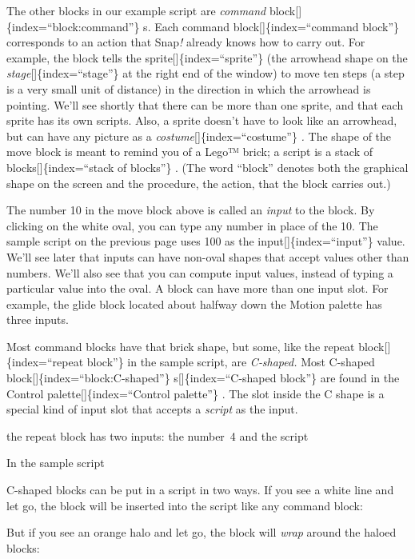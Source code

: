 \documentclass[
  letterpaper,
]{book}
\begin{document}
The other blocks in our example script are \emph{command}
block{[}{]}\{index=``block:command''\} s. Each command
block{[}{]}\{index=``command block''\} corresponds to an action that
Snap\emph{!} already knows how to carry out. For example, the block
tells the sprite{[}{]}\{index=``sprite''\} (the arrowhead shape on the
\emph{stage}{[}{]}\{index=``stage''\} at the right end of the window) to
move ten steps (a step is a very small unit of distance) in the
direction in which the arrowhead is pointing. We'll see shortly that
there can be more than one sprite, and that each sprite has its own
scripts. Also, a sprite doesn't have to look like an arrowhead, but can
have any picture as a \emph{costume}{[}{]}\{index=``costume''\} \emph{.}
The shape of the move block is meant to remind you of a Lego™ brick; a
script is a stack of blocks{[}{]}\{index=``stack of blocks''\} . (The
word ``block'' denotes both the graphical shape on the screen and the
procedure, the action, that the block carries out.)

The number 10 in the move block above is called an \emph{input} to the
block. By clicking on the white oval, you can type any number in place
of the 10. The sample script on the previous page uses 100 as the
input{[}{]}\{index=``input''\} value. We'll see later that inputs can
have non-oval shapes that accept values other than numbers. We'll also
see that you can compute input values, instead of typing a particular
value into the oval. A block can have more than one input slot. For
example, the glide block located about halfway down the Motion palette
has three inputs.

Most command blocks have that brick shape, but some, like the repeat
block{[}{]}\{index=``repeat block''\} in the sample script, are
\emph{C‑shaped.} Most C-shaped block{[}{]}\{index=``block:C-shaped''\}
s{[}{]}\{index=``C-shaped block''\} are found in the Control
palette{[}{]}\{index=``Control palette''\} . The slot inside the C shape
is a special kind of input slot that accepts a \emph{script} as the
input.

the repeat block has two inputs: the number~4 and the script

In the sample script

C-shaped blocks can be put in a script in two ways. If you see a white
line and let go, the block will be inserted into the script like any
command block:

But if you see an orange halo and let go, the block will \emph{wrap}
around the haloed blocks:
\end{document}
